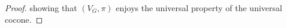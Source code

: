 \documentclass[12pt]{scrartcl}
\newcommand{\C}{\mathds{C}}
\newcommand{\be}{\begin{equation}}
\newcommand{\ee}{\end{equation}}
\theoremstyle{definition}
\numberwithin{equation}{section}
\numberwithin{definition}{section}
\numberwithin{figure}{section}
\begin{document}
\begin{proof}
showing that $(V_G,\pi)$ enjoys the universal property of the universal cocone.
\end{proof}
\end{document}
